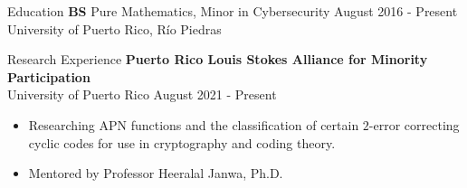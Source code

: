 \documentclass{resume} %
\begin{document}

\begin{rSection}{Education}
    \textbf{BS} \hspace*{10mm} Pure Mathematics, Minor in Cybersecurity
    \hfill{August 2016 - Present} \\
     \hspace*{17mm} University of Puerto Rico, R\'io Piedras
\end{rSection}



\begin{rSection}{Research Experience}
    \textbf{Puerto Rico Louis Stokes Alliance for Minority Participation} \\
    University of Puerto Rico \hfill{August 2021 - Present}
    \begin{itemize}
        \item Researching APN functions and the classification of certain
            $2$-error correcting cyclic codes for use in cryptography and coding
            theory.

        \item Mentored by Professor Heeralal Janwa, Ph.D.
    \end{itemize}
\end{rSection}
\end{document}

